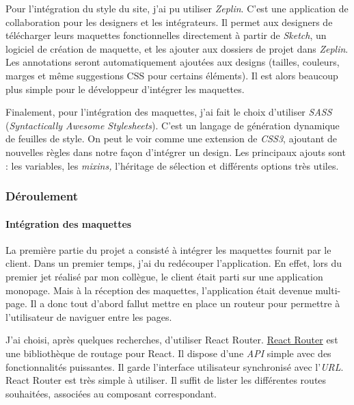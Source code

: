 Pour l'intégration du style du site, j'ai pu utiliser \emph{Zeplin}.
C'est une application de collaboration pour les designers et les
intégrateurs. Il permet aux designers de télécharger leurs maquettes
fonctionnelles directement à partir de \emph{Sketch}, un logiciel de
création de maquette, et les ajouter aux dossiers de projet dans
\emph{Zeplin}. Les annotations seront automatiquement ajoutées aux
designs (tailles, couleurs, marges et même suggestions CSS pour certains
éléments). Il est alors beaucoup plus simple pour le développeur
d'intégrer les maquettes.

\bigskip

Finalement, pour l'intégration des maquettes, j'ai fait le choix
d'utiliser \emph{SASS} (\emph{Syntactically Awesome Stylesheets}). C'est
un langage de génération dynamique de feuilles de style. On peut le voir
comme une extension de \emph{CSS3}, ajoutant de nouvelles règles dans
notre façon d'intégrer un design. Les principaux ajouts sont : les
variables, les \emph{mixins,} l'héritage de sélection et différents
options très utiles.

\bigskip

\subsubsection{Déroulement}\label{duxe9roulement}

\bigskip

\paragraph{Intégration des
maquettes}\label{intuxe9gration-des-maquettes}

\bigskip

La première partie du projet a consisté à intégrer les maquettes fournit
par le client. Dans un premier temps, j'ai du redécouper l'application.
En effet, lors du premier jet réalisé par mon collègue, le client était
parti sur une application monopage. Mais à la réception des maquettes,
l'application était devenue multi-page. Il a donc tout d'abord fallut
mettre en place un routeur pour permettre à l'utilisateur de naviguer
entre les pages.

\bigskip

J'ai choisi, après quelques recherches, d'utiliser React Router.
\href{https://github.com/ReactTraining/react-router}{React Router} est
une bibliothèque de routage pour React. Il dispose d'une \emph{API}
simple avec des fonctionnalités puissantes. Il garde l'interface
utilisateur synchronisé avec l'\emph{URL}. React Router est très simple
à utiliser. Il suffit de lister les différentes routes souhaitées,
associées au composant correspondant.

